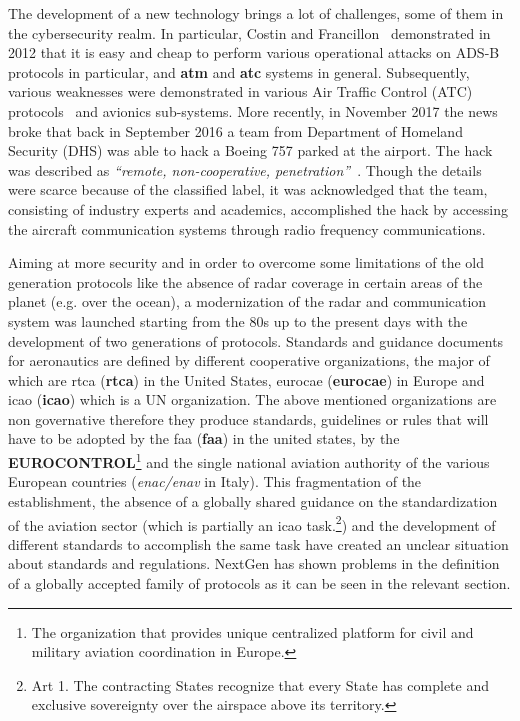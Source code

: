 \documentclass[../main.tex]{subfiles}
\begin{document}
The development of a new technology brings a lot of challenges, some of them in the cybersecurity realm.
In particular, Costin and Francillon~\cite{costin2012ghost} demonstrated in 2012 that it is easy and cheap to perform various operational attacks on ADS-B protocols in particular, and \textbf{\acrshort{atm}} and \textbf{\acrshort{atc}} systems in general.
Subsequently, various weaknesses were demonstrated in various Air Traffic Control (ATC) protocols~\cite{renderman,teso} and avionics sub-systems.
More recently, in November 2017 the news broke that back in September 2016 a team from Department of Homeland Security (DHS) was able to hack a Boeing 757 parked at the airport. The hack was described as \emph{``remote, non-cooperative, penetration''}~\cite{news-boeinghack-cso}.
Though the details were scarce because of the classified label, it was acknowledged that the team, consisting of industry experts and academics, accomplished the hack by accessing the aircraft communication systems through radio frequency communications.

Aiming at more security and in order to overcome some limitations of the old generation protocols like the absence of radar coverage in certain areas of the planet (e.g. over the ocean), a modernization of the radar and communication system was launched starting from the 80s up to the present days with the development of two generations of protocols. Standards and guidance documents for aeronautics are defined by different cooperative organizations, the major of which are \acrlong{rtca} (\textbf{\acrshort{rtca}}) in the United States, \acrlong{eurocae} (\textbf{\acrshort{eurocae}}) in Europe and \acrlong{icao} (\textbf{\acrshort{icao}}) which is a UN organization. The above mentioned organizations are non governative therefore they produce standards, guidelines or rules that will have to be adopted by the \acrlong{faa} (\textbf{\acrshort{faa}}) in the united states, by the \textbf{EUROCONTROL}\footnote{The organization that provides unique centralized platform for civil and military aviation coordination in Europe.} and the single national aviation authority of the various European countries (\textit{\acrshort{enac}/\acrshort{enav}} in Italy). This fragmentation of the establishment, the absence of a globally shared guidance on the standardization of the aviation sector (which is partially an \acrshort{icao} task.\footnote{Art 1. The contracting States recognize that every  State has complete and exclusive sovereignty over the airspace above its territory.\cite{icao7300}}) and the development of different standards to accomplish the same task have created an unclear situation about standards and regulations. NextGen has shown problems in the definition of a globally accepted family of protocols as it can be seen in the relevant section.
\end{document}
